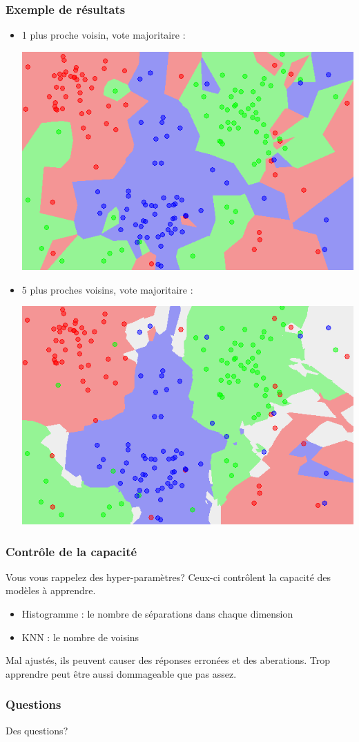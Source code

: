 \documentclass[french]{beamer}
\begin{document}
\begin{frame}
\frametitle{Exemple de résultats}
\begin{itemize}
\item 1 plus proche voisin, vote majoritaire :
\begin{center}
\includegraphics[scale=0.3]{Map1NN.png}
\end{center}

\item 5 plus proches voisins, vote majoritaire :
\begin{center}
\includegraphics[scale=0.3]{Map5NN.png}
\end{center}
\end{itemize}

\end{frame}



\begin{frame}
\frametitle{Contrôle de la capacité}
Vous vous rappelez des hyper-paramètres? Ceux-ci contrôlent la capacité des modèles à apprendre.

\begin{itemize}
\item Histogramme : le nombre de séparations dans chaque dimension
\item KNN : le nombre de voisins
\end{itemize}

\pause
Mal ajustés, ils peuvent causer des réponses erronées et des aberations. Trop apprendre peut être aussi dommageable que pas assez.
\end{frame}

\begin{frame}
\frametitle{Questions}

\begin{center}
Des questions?
\end{center}

\end{frame}
\end{document}
